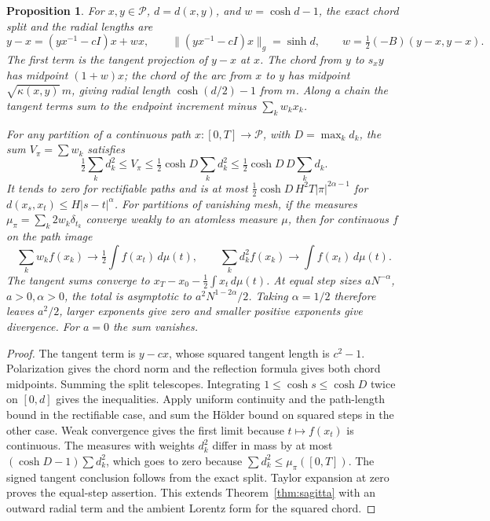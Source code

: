 \documentclass[11pt,reqno]{amsart}
\newtheorem{proposition}[theorem]{Proposition}
\theoremstyle{definition}
\theoremstyle{remark}
\numberwithin{equation}{section}
\begin{document}
\begin{proposition}\label{m3:sagitta}
For \(x,y\in\mathcal P\), \(d=d(x,y)\), and \(w=\cosh d-1\), the exact
chord split and the radial lengths are
\[
 y-x=(yx^{-1}-cI)x+wx,\qquad
 \|(yx^{-1}-cI)x\|_{g}=\sinh d,\qquad
 w=\tfrac12(-B)(y-x,y-x).
\]
The first term is the tangent projection of \(y-x\) at \(x\).
The chord from \(y\) to \(s_xy\) has midpoint \((1+w)x\);
the chord of the arc from \(x\) to \(y\) has midpoint
\(\sqrt{\kappa(x,y)}\,m\), giving radial length \(\cosh(d/2)-1\)
from \(m\). Along a chain the tangent terms sum to the endpoint
increment minus \(\sum_k w_k x_k\).

For any partition of a continuous path \(x:[0,T]\to\mathcal P\), with
\(D=\max_k d_k\), the sum \(V_\pi=\sum w_k\) satisfies
\[
 \tfrac12\sum_k d_k^2\le V_\pi
 \le\tfrac12\cosh D\sum_k d_k^2
 \le\tfrac12\cosh D\,D\sum_k d_k .
\]
It tends to zero for rectifiable paths and is at most
\(\tfrac12\cosh D\,H^2T|\pi|^{2\alpha-1}\) for
\(d(x_s,x_t)\le H|s-t|^\alpha\). For partitions of vanishing mesh,
if the measures \(\mu_\pi=\sum_k2w_k\delta_{t_k}\) converge weakly
to an atomless measure \(\mu\), then for continuous \(f\) on the
path image
\[
 \sum_k w_k f(x_k)\to\tfrac12\int f(x_t)\,d\mu(t),\qquad
 \sum_k d_k^2 f(x_k)\to\int f(x_t)\,d\mu(t).
\]
The tangent sums converge to \(x_T-x_0-\tfrac12\int x_t\,d\mu(t)\).
At equal step sizes \(aN^{-\alpha}\), \(a>0,\alpha>0\), the total is
asymptotic to \(a^2N^{1-2\alpha}/2\). Taking \(\alpha=1/2\)
therefore leaves \(a^2/2\), larger exponents give zero and smaller
positive exponents give divergence. For \(a=0\) the sum vanishes.
\end{proposition}
\begin{proof}
The tangent term is \(y-cx\), whose squared tangent length is
\(c^2-1\). Polarization gives the chord norm and the reflection
formula gives both chord midpoints. Summing the split telescopes.
Integrating \(1\le\cosh s\le\cosh D\) twice on \([0,d]\)
gives the inequalities. Apply uniform continuity and the path-length
bound in the rectifiable case, and sum the H\"older bound on squared
steps in the other case. Weak convergence gives the first limit
because \(t\mapsto f(x_t)\) is continuous. The measures with
weights \(d_k^2\) differ in mass by at most
\((\cosh D-1)\sum d_k^2\), which goes to zero because
\(\sum d_k^2\le\mu_\pi([0,T])\). The signed tangent conclusion
follows from the exact split. Taylor expansion at zero proves the
equal-step assertion. This extends Theorem~\ref{thm:sagitta} with an outward radial term
and the ambient Lorentz form for the squared chord.
\end{proof}
\end{document}
